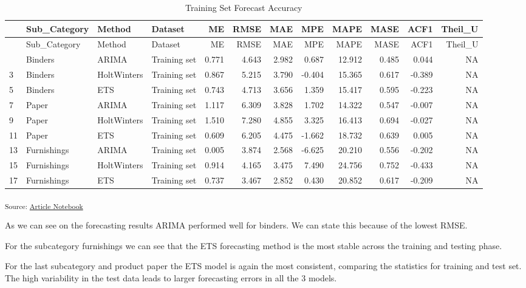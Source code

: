 \documentclass[
  letterpaper,
  DIV=11,
  numbers=noendperiod,
  oneside]{scrartcl}
\begin{document}
\begin{longtable}[]{@{}llllrrrrrrrr@{}}
\caption{Training Set Forecast Accuracy}\tabularnewline
\toprule\noalign{}
& Sub\_Category & Method & Dataset & ME & RMSE & MAE & MPE & MAPE & MASE
& ACF1 & Theil\_U \\
\midrule\noalign{}
\endfirsthead
\toprule\noalign{}
& Sub\_Category & Method & Dataset & ME & RMSE & MAE & MPE & MAPE & MASE
& ACF1 & Theil\_U \\
\midrule\noalign{}
\endhead
\bottomrule\noalign{}
\endlastfoot
1 & Binders & ARIMA & Training set & 0.771 & 4.643 & 2.982 & 0.687 &
12.912 & 0.485 & 0.044 & NA \\
3 & Binders & HoltWinters & Training set & 0.867 & 5.215 & 3.790 &
-0.404 & 15.365 & 0.617 & -0.389 & NA \\
5 & Binders & ETS & Training set & 0.743 & 4.713 & 3.656 & 1.359 &
15.417 & 0.595 & -0.223 & NA \\
7 & Paper & ARIMA & Training set & 1.117 & 6.309 & 3.828 & 1.702 &
14.322 & 0.547 & -0.007 & NA \\
9 & Paper & HoltWinters & Training set & 1.510 & 7.280 & 4.855 & 3.325 &
16.413 & 0.694 & -0.027 & NA \\
11 & Paper & ETS & Training set & 0.609 & 6.205 & 4.475 & -1.662 &
18.732 & 0.639 & 0.005 & NA \\
13 & Furnishings & ARIMA & Training set & 0.005 & 3.874 & 2.568 & -6.625
& 20.210 & 0.556 & -0.202 & NA \\
15 & Furnishings & HoltWinters & Training set & 0.914 & 4.165 & 3.475 &
7.490 & 24.756 & 0.752 & -0.433 & NA \\
17 & Furnishings & ETS & Training set & 0.737 & 3.467 & 2.852 & 0.430 &
20.852 & 0.617 & -0.209 & NA \\
\end{longtable}

\textsubscript{Source:
\href{https://SJbrou.github.io/Supply_Chain_Data_Analysis/index.qmd.html}{Article
Notebook}}

As we can see on the forecasting results ARIMA performed well for
binders. We can state this because of the lowest RMSE.

For the subcategory furnishings we can see that the ETS forecasting
method is the most stable across the training and testing phase.

For the last subcategory and product paper the ETS model is again the
most consistent, comparing the statistics for training and test set. The
high variability in the test data leads to larger forecasting errors in
all the 3 models.
\end{document}
